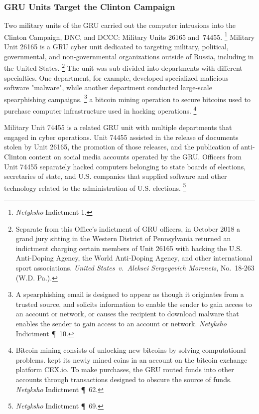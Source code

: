 \subsubsection{GRU Units Target the Clinton Campaign}

Two military units of the GRU carried out the computer intrusions into the Clinton Campaign, DNC, and DCCC: Military Units 26165 and~74455.%
\footnote{\textit{Netyksho} Indictment 1.}
Military Unit 26165 is a GRU cyber unit dedicated to targeting military, political, governmental, and non-governmental organizations outside of Russia, including in the United States.%
\footnote{Separate from this Office's indictment of GRU officers, in October 2018 a grand jury sitting in the Western District of Pennsylvania returned an indictment charging certain members of Unit 26165 with hacking the U.S. Anti-Doping Agency, the World Anti-Doping Agency, and other international sport associations.
\textit{United States~v.\ Aleksei Sergeyevich Morenets}, No.~18-263 (W.D. Pa.).}
The unit was sub-divided into departments with different specialties.
One department, for example, developed specialized malicious software "malware", while another department conducted large-scale spearphishing campaigns.%
\footnote{A spearphishing email is designed to appear as though it originates from a trusted source, and solicits information to enable the sender to gain access to an account or network, or causes the recipient to download malware that enables the sender to gain access to an account or network.
\textit{Netyksho} Indictment \P~10.}
 a bitcoin mining operation to secure bitcoins used to purchase computer infrastructure used in hacking operations.%
\footnote{Bitcoin mining consists of unlocking new bitcoins by solving computational problems.
 kept its newly mined coins in an account on the bitcoin exchange platform CEX.io.
To make purchases, the GRU routed funds into other accounts through transactions designed to obscure the source
of funds.
\textit{Netyksho} Indictment \P~62.}

Military Unit 74455 is a related GRU unit with multiple departments that engaged in cyber operations.
Unit 74455 assisted in the release of documents stolen by Unit 26165, the promotion of those releases, and the publication of anti-Clinton content on social media accounts operated by the GRU\null.
Officers from Unit 74455 separately hacked computers belonging to state boards of elections, secretaries of state, and U.S. companies that supplied software and other technology related to the administration of U.S. elections.%
\footnote{\textit{Netyksho} Indictment \P~69.}

